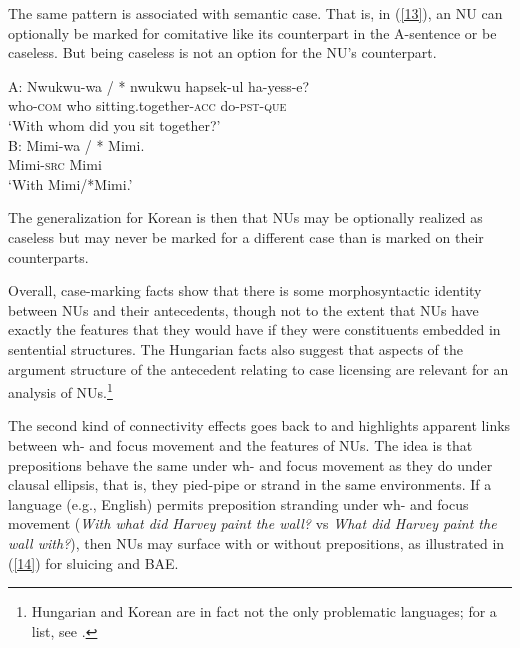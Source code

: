 \documentclass[output=paper
                ,modfonts
                ,nonflat
	        ,collection
	        ,collectionchapter
	        ,collectiontoclongg
 	        ,biblatex
                ,babelshorthands
                ,newtxmath
                ,draftmode
                ,colorlinks, citecolor=brown
]{./langsci/langscibook}
\begin{document}
{The same pattern is associated with semantic case. That is, in (\ref{13}), an NU can optionally be
marked for comitative like its counterpart in the A-sentence or be caseless. But being caseless is not an option for the NU's counterpart.

\ea
A:
\gll Nwukwu-wa         /  *  nwukwu  hapsek-ul                     ha-yess-e?\\
     who-\textsc{com}  {} {} who     sitting.together-\textsc{acc} do-\textsc{pst}-\textsc{que}\\
\glt  `With whom did you sit together?'\\

B:
\gll Mimi-wa / * Mimi.\\
     Mimi-\textsc{src} {} {} Mimi\\
\glt `With Mimi/*Mimi.' \label{13}\z

The generalization for Korean is then that NUs may be optionally realized as caseless but may never be marked for a different case than is marked on their counterparts.

Overall, case-marking facts show that there is some morphosyntactic identity between NUs and their antecedents, though not to the extent that NUs have exactly the features that they would have if they were constituents embedded in sentential structures. The Hungarian facts also suggest that aspects of the argument structure of the antecedent relating to case licensing are relevant for an analysis of NUs.\footnote{Hungarian and Korean are in fact not the only problematic languages; for a list, see \citet{Vicente2015}.}

The second kind of connectivity effects goes back to \citet{Merchant2001, Merchant2005a} and highlights apparent links between wh- and focus movement and the features of NUs. The idea is that prepositions behave the same under wh- and focus movement as they do under clausal ellipsis, that is, they pied-pipe or strand in the same environments. If a language (e.g., English) permits preposition stranding under wh- and focus movement (\emph{With what did Harvey paint the wall?} vs \emph{What did Harvey paint the wall with?}), then NUs may surface with or without prepositions, as illustrated in (\ref{14}) for sluicing and BAE.

}
\end{document}
